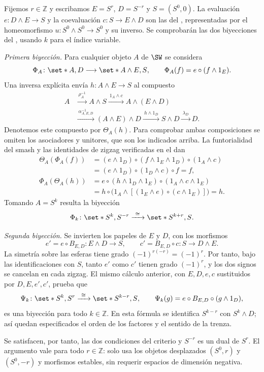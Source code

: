 \begin{sol}
Fijemos $r\in\mathbb Z$ y escribamos $E=S^r$, $D=S^{-r}$ y $S=(S^0,0)$. La evaluación $e\colon D\wedge E\to S$ y la coevaluación $c\colon S\to E\wedge D$ son las del , representadas por el homeomorfismo $u\colon S^0\wedge S^0\to S^0$ y su inverso. Se comprobarán las dos biyecciones del , usando $k$ para el índice variable.

\emph{Primera biyección.} Para cualquier objeto $A$ de $\SW$ se considera
\[
\Phi_A\colon\set*{A,D}\longrightarrow\set*{A\wedge E,S},
\qquad
\Phi_A(f)=e\circ(f\wedge1_E).
\]
Una inversa explícita envía $h\colon A\wedge E\to S$ al compuesto
\[
\begin{aligned}
A&\xrightarrow{\ \rho_A^{-1}\ }A\wedge S
\xrightarrow{\ 1_A\wedge c\ }A\wedge(E\wedge D)\\
&\xrightarrow{\ \alpha^{-1}_{A,E,D}\ }(A\wedge E)\wedge D
\xrightarrow{\ h\wedge1_D\ }S\wedge D
\xrightarrow{\ \lambda_D\ }D.
\end{aligned}
\]
Denotemos este compuesto por $\Theta_A(h)$. Para comprobar ambas composiciones se omiten los asociadores y unitores, que son los indicados arriba. La funtorialidad del smash y las identidades de zigzag verificadas en el  dan
\[
\begin{aligned}
\Theta_A(\Phi_A(f))
&=(e\wedge1_D)\circ(f\wedge1_E\wedge1_D)\circ(1_A\wedge c)\\
&=(e\wedge1_D)\circ(1_D\wedge c)\circ f=f,\\[0.4em]
\Phi_A(\Theta_A(h))
&=e\circ(h\wedge1_D\wedge1_E)\circ(1_A\wedge c\wedge1_E)\\
&=h\circ\bigl(1_A\wedge[(1_E\wedge e)\circ(c\wedge1_E)]\bigr)=h.
\end{aligned}
\]
Tomando $A=S^k$ resulta la biyección
\[
\Phi_k\colon\set*{S^k,S^{-r}}\xrightarrow{\ \cong\ }\set*{S^{k+r},S}.
\]

\emph{Segunda biyección.} Se invierten los papeles de $E$ y $D$, con los morfismos
\[
e'=e\circ B_{E,D}\colon E\wedge D\longrightarrow S,
\qquad
c'=B_{E,D}\circ c\colon S\longrightarrow D\wedge E.
\]
La simetría sobre las esferas tiene grado $(-1)^{r(-r)}=(-1)^r$. Por tanto, bajo las identificaciones con $S$, tanto $e'$ como $c'$ tienen grado $(-1)^r$, y los dos signos se cancelan en cada zigzag. El mismo cálculo anterior, con $E,D,e,c$ sustituidos por $D,E,e',c'$, prueba que
\[
\Psi_k\colon\set*{S^k,S^r}\xrightarrow{\ \cong\ }\set*{S^{k-r},S},
\qquad
\Psi_k(g)=e\circ B_{E,D}\circ(g\wedge1_D),
\]
es una biyección para todo $k\in\mathbb Z$. En esta fórmula se identifica $S^{k-r}$ con $S^k\wedge D$; así quedan especificados el orden de los factores y el sentido de la trenza.

Se satisfacen, por tanto, las dos condiciones del criterio y $S^{-r}$ es un dual de $S^r$. El argumento vale para todo $r\in\mathbb Z$: solo usa los objetos desplazados $(S^0,r)$ y $(S^0,-r)$ y morfismos estables, sin requerir espacios de dimensión negativa.
\end{sol}


